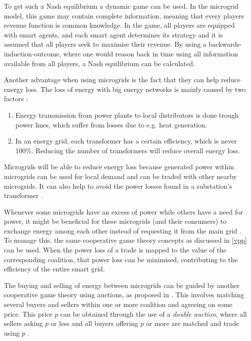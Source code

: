 To get such a Nash equilibrium a dynamic game can be used. In the microgrid model, this game may contain complete information, meaning that every players revenue function is common knowledge. In the game, all players are equipped with smart agents, and each smart agent determines its strategy and it is assumed that all players seek to maximise their revenue. By using a backwards-induction-outcome, where one would reason back in time using all information available from all players, a Nash equilibrium can be calculated\cite{MicrogridModellingPetrosAristidou}.

Another advantage when using microgrids is the fact that they can help reduce energy loss. The loss of energy with big energy networks is mainly caused by two factors \cite{EnergyLossURL}: 

\begin{enumerate}
\item Energy transmission from power plants to local distributors is done trough power lines, which suffer from losses due to e.g. heat generation\cite{LasseterPaigi2004}.
\item In an energy grid, each transformer has a certain efficiency, which is never 100\%. Reducing the number of transformers will reduce overall energy loss.
\end{enumerate}

Microgrids will be able to reduce energy loss because generated power within microgrids can be used for local demand and can be traded with other nearby microgrids. It can also help to avoid the power losses found in a substation's transformer \cite{keypaper}.

Whenever some microgrids have an excess of power while others have a need for power, it might be beneficial for these microgrids (and their consumers) to exchange energy among each other instead of requesting it from the main grid \cite{SaadHanPoorEtAl2011}. To manage this, the same cooperative game theory concepts as discussed in \ref{vpp} can be used. When the power loss of a trade is mapped to the value of the corresponding coalition, that power loss can be minimised, contributing to the efficiency of the entire smart grid. 

The buying and selling of energy between microgrids can be guided by another cooperative game theory using auctions, as proposed in \cite{SaadHanPoorEtAl2011}. This involves matching several buyers and sellers within one or more coalition and agreeing on some price. This price $p$ can be obtained through the use of a \emph{double auction}, where all sellers asking $p$ or less and all buyers offering $p$ or more are matched and trade using $p$ \cite{gjerstad1998price}.

